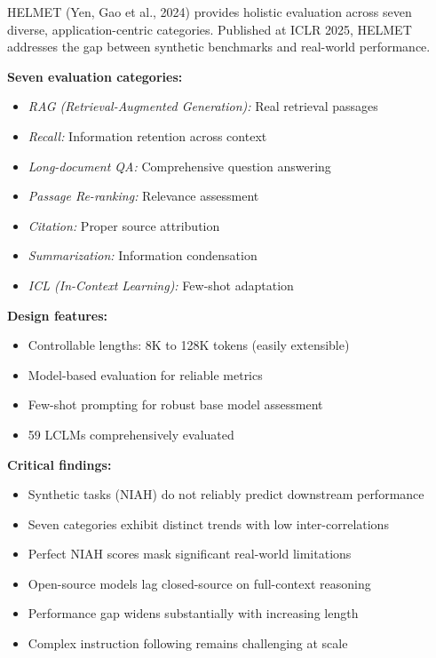 \documentclass[11pt]{article}
\begin{document}
HELMET (Yen, Gao et al., 2024) provides holistic evaluation across seven diverse, application-centric categories. Published at ICLR 2025, HELMET addresses the gap between synthetic benchmarks and real-world performance.

\textbf{Seven evaluation categories:}
\begin{itemize}[leftmargin=*]
    \item \textit{RAG (Retrieval-Augmented Generation):} Real retrieval passages
    \item \textit{Recall:} Information retention across context
    \item \textit{Long-document QA:} Comprehensive question answering
    \item \textit{Passage Re-ranking:} Relevance assessment
    \item \textit{Citation:} Proper source attribution
    \item \textit{Summarization:} Information condensation
    \item \textit{ICL (In-Context Learning):} Few-shot adaptation
\end{itemize}

\textbf{Design features:}
\begin{itemize}[leftmargin=*]
    \item Controllable lengths: 8K to 128K tokens (easily extensible)
    \item Model-based evaluation for reliable metrics
    \item Few-shot prompting for robust base model assessment
    \item 59 LCLMs comprehensively evaluated
\end{itemize}

\textbf{Critical findings:}
\begin{itemize}[leftmargin=*]
    \item Synthetic tasks (NIAH) do not reliably predict downstream performance
    \item Seven categories exhibit distinct trends with low inter-correlations
    \item Perfect NIAH scores mask significant real-world limitations
    \item Open-source models lag closed-source on full-context reasoning
    \item Performance gap widens substantially with increasing length
    \item Complex instruction following remains challenging at scale
\end{itemize}
\end{document}
